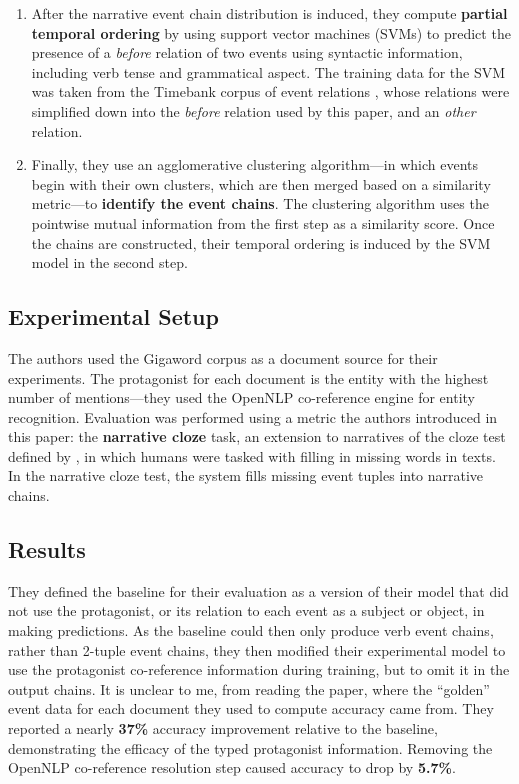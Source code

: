 \begin{enumerate}
\item After the narrative event chain distribution is induced, they compute \textbf{partial temporal ordering} by using support vector machines (SVMs) to predict the presence of a \textit{before} relation of two events using syntactic information, including verb tense and grammatical aspect. The training data for the SVM was taken from the Timebank corpus of event relations \citep{pustejovsky2003timebank}, whose relations were simplified down into the \textit{before} relation used by this paper, and an \textit{other} relation.

\item Finally, they use an agglomerative clustering algorithm---in which events begin with their own clusters, which are then merged based on a similarity metric---to \textbf{identify the event chains}. The clustering algorithm uses the pointwise mutual information from the first step as a similarity score. Once the chains are constructed, their temporal ordering is induced by the SVM model in the second step.
\end{enumerate}

\subsection{Experimental Setup}
\label{sec:narrativecloze}
The authors used the Gigaword corpus \citep{parker2011english} as a document source for their experiments. The protagonist for each document is the entity with the highest number of mentions---they used the OpenNLP co-reference engine \citep{baldridge2005opennlp} for entity recognition.  Evaluation was performed using a metric the authors introduced in this paper: the \textbf{narrative cloze} task, an extension to narratives of the cloze test defined by \citep{taylor1953cloze}, in which humans were tasked with filling in missing words in texts. In the narrative cloze test, the system fills missing event tuples into narrative chains.

\subsection{Results}
They defined the baseline for their evaluation as a version of their model that did not use the protagonist, or its relation to each event as a subject or object, in making predictions. As the baseline could then only produce verb event chains, rather than 2-tuple event chains, they then modified their experimental model to use the protagonist co-reference information during training, but to omit it in the output chains. It is unclear to me, from reading the paper,  where the ``golden'' event data for each document they used to compute accuracy came from. They reported a nearly \textbf{37\%} accuracy improvement relative to the baseline, demonstrating the efficacy of the typed protagonist information. Removing the OpenNLP co-reference resolution step caused accuracy to drop by \textbf{5.7\%}.

